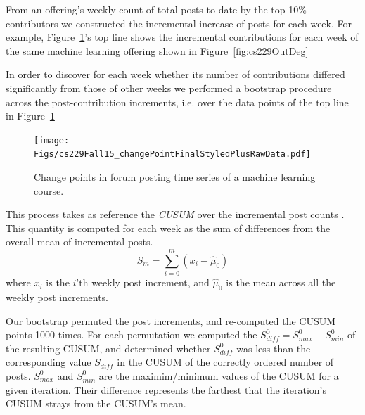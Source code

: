 From an offering's weekly count of total posts to date by the top 10\%
contributors we constructed the incremental increase of posts for each
week. For example, Figure~\ref{fig:cs229ChangePts}'s top line shows
the incremental contributions for each week of the same machine
learning offering shown in Figure~\ref{fig:cs229OutDeg}

In order to discover for each week whether its number of contributions
differed significantly from those of other weeks we performed a
bootstrap procedure across the post-contribution increments, i.e. over
the data points of the top line in Figure~\ref{fig:cs229ChangePts}
\cite{tayl16}
\begin{figure}[]
       \centering
       \texttt{[image: Figs/cs229Fall15\_changePointFinalStyledPlusRawData.pdf]}
       \caption{\textnormal{Change points in forum posting 
           time series of a machine learning course.}}
       \label{fig:cs229ChangePts}
\end{figure}
This process takes as reference the {\em CUSUM} over the incremental
post counts \cite{nist2012}. This quantity is computed for each week
as the sum of differences from the overall mean of incremental posts.
\begin{equation}
S_m = \sum_{i=0}^{m}(x_i-\hat{\mu}_0)
\end{equation}
where $x_i$ is the $i$'th weekly post increment, and $\hat{\mu}_0$ is
the mean across all the weekly post increments.

Our bootstrap permuted the post increments, and re-computed the CUSUM
points 1000 times. For each permutation we computed the $S_{diff}^0 =
S_{max}^0-S_{min}^0$ of the resulting CUSUM, and determined whether
$S_{diff}^0$ was less than the corresponding value $S_{diff}$ in the
CUSUM of the correctly ordered number of posts. $S_{max}^0$ and
$S_{min}^0$ are the maximim/minimum values of the CUSUM for a given
iteration. Their difference represents the farthest that the
iteration's CUSUM strays from the CUSUM's mean.

